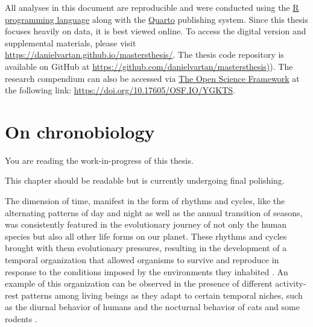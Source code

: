 \documentclass[
12pt,
openright,
oneside,
a4paper,
chapter=TITLE,
section=TITLE,
french,
spanish,
brazil,
english
]{abntex2}\usepackage{array}
\newcommand{\microskip}{\vspace{\microskipamount}}
\begin{document}
All analyses in this document are reproducible and were conducted using
the \href{https://www.r-project.org/}{R programming language} along with
the \href{https://quarto.org/}{Quarto} publishing system. Since this
thesis focuses heavily on data, it is best viewed online. To access the
digital version and supplemental materials, please visit
\url{https://danielvartan.github.io/mastersthesis/}. The thesis code
repository is available on GitHub at
\href{https://github.com/danielvartan/mastersthesis}{https://github.com/danielvartan/mastersthesis)}).
The research compendium can also be accessed via
\href{https://osf.io/}{The Open Science Framework} at the following
link: \url{https://doi.org/10.17605/OSF.IO/YGKTS}.


\chapter{On chronobiology}\label{on-chronobiology}

\begin{tcolorbox}[enhanced jigsaw, coltitle=black, opacitybacktitle=0.6, colframe=quarto-callout-note-color-frame, arc=.35mm, colbacktitle=quarto-callout-note-color!10!white, titlerule=0mm, title=\textcolor{quarto-callout-note-color}{\faInfo}\hspace{0.5em}{Note}, breakable, bottomrule=.15mm, rightrule=.15mm, bottomtitle=1mm, left=2mm, opacityback=0, toprule=.15mm, leftrule=.75mm, toptitle=1mm, colback=white]

You are reading the work-in-progress of this thesis.

\microskip

This chapter should be readable but is currently undergoing final
polishing.

\end{tcolorbox}

The dimension of time, manifest in the form of rhythms and cycles, like
the alternating patterns of day and night as well as the annual
transition of seasons, was consistently featured in the evolutionary
journey of not only the human species but also all other life forms on
our planet. These rhythms and cycles brought with them evolutionary
pressures, resulting in the development of a temporal organization that
allowed organisms to survive and reproduce in response to the conditions
imposed by the environments they inhabited
\autocite{pittendrigh1981,menna-barreto2003}. An example of this
organization can be observed in the presence of different activity-rest
patterns among living beings as they adapt to certain temporal niches,
such as the diurnal behavior of humans and the nocturnal behavior of
cats and some rodents \autocite{foster2005}.
\end{document}
